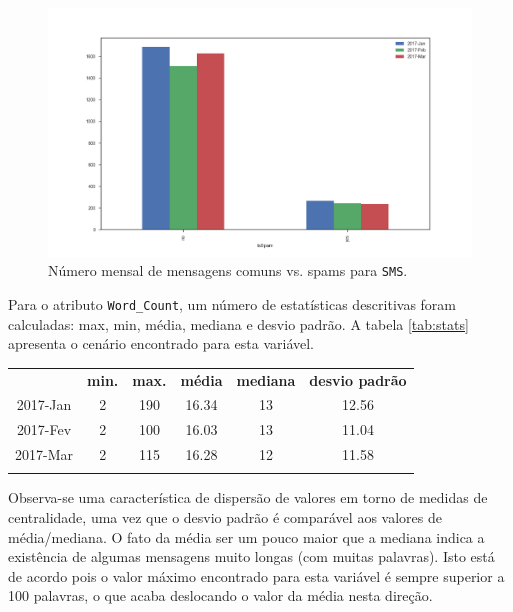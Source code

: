 \documentclass[a4paper,11pt]{article}
\begin{document}
\begin{figure}[htbp]
    \centering
    \includegraphics[width=\textwidth]{monthly_spam.png}
    \caption[Figura simples]{Número mensal de mensagens comuns vs. spams para \texttt{SMS}.}
    \label{fig:monthly_spam}
\end{figure}


Para o atributo \texttt{Word\_Count}, um número de estatísticas descritivas foram calculadas: 
max, min, média, mediana e desvio padrão. A tabela \ref{tab:stats} apresenta o cenário encontrado para
esta variável.



\vspace{.5cm}
{}
\begin{center}
\begin{tabular}{cccccc}
 \hline
            &  \textbf{min.} &  \textbf{max.}  &  \textbf{média}  & \textbf{mediana}  & \textbf{desvio padrão}\\
  2017-Jan  &  2    &  190  &  16.34  &  13  &  12.56 \\
  2017-Fev  &  2    &  100  &  16.03  &  13  &  11.04  \\
  2017-Mar  &  2    &  115  &  16.28  &  12  &  11.58  \\
 \hline
 \label{tab:stats}
\end{tabular}
\end{center}

Observa-se uma característica de dispersão de valores em torno de medidas de centralidade, uma vez 
que o desvio padrão é comparável aos valores de média/mediana. O fato da média ser um pouco maior 
que a mediana indica a existência de algumas mensagens muito longas (com muitas palavras). Isto
está de acordo pois o valor máximo encontrado para esta variável é sempre superior a 100 palavras,
o que acaba deslocando o valor da média nesta direção.
\end{document}
